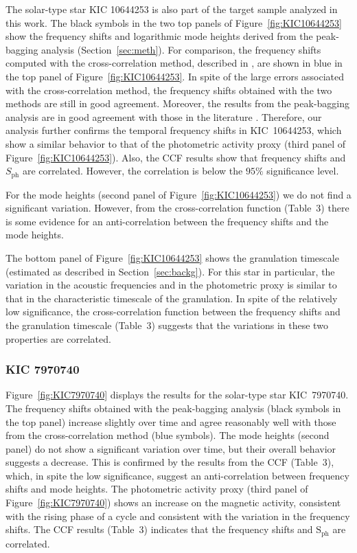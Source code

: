 \documentclass[twocolumn]{aastex61}%
\begin{document}
The solar-type star KIC 10644253 is also part of the target sample analyzed in this work. The black symbols in the two top panels of Figure~\ref{fig:KIC10644253} show the frequency shifts and logarithmic mode heights derived from the peak-bagging analysis (Section~\ref{sec:meth}). For comparison, the frequency shifts computed with the cross-correlation method, described in \citet{Kiefer2017}, are shown in blue in the top panel of Figure~\ref{fig:KIC10644253}. In spite of the large errors associated with the cross-correlation method, the frequency shifts obtained with the two methods are still in good agreement. Moreover, the results from the peak-bagging analysis are in good agreement with those in the literature \citep{Salabert2016,Kiefer2017}. Therefore, our analysis further confirms the temporal frequency shifts in KIC~10644253, which show a similar behavior to that of the photometric activity proxy (third panel of Figure~\ref{fig:KIC10644253}). Also, the CCF results show that frequency shifts and $S_\text{ph}$ are correlated. However, the correlation is below the $95\%$ significance level.

For the mode heights (second panel of Figure~\ref{fig:KIC10644253}) we do not find a significant variation. However, from the cross-correlation function (Table~3) there is some evidence for an anti-correlation between the frequency shifts and the mode heights.%

The bottom panel of Figure~\ref{fig:KIC10644253} shows the granulation timescale (estimated as described in Section~\ref{sec:backg}). For this star in particular, the variation in the acoustic frequencies and in the photometric proxy is similar to that  in the characteristic timescale of the granulation. In spite of the relatively low significance, the cross-correlation function between the frequency shifts and the granulation timescale (Table~3) suggests that the variations in these two properties are correlated.%

\subsubsection{KIC 7970740}

Figure~\ref{fig:KIC7970740} displays the results for the solar-type star KIC~7970740. The frequency shifts obtained with the peak-bagging analysis (black symbols in the top panel) increase slightly over time and agree reasonably well with those from the cross-correlation method (blue symbols). The mode heights (second panel) do not show a significant variation over time, but their overall behavior suggests a decrease. This is confirmed by the results from the CCF (Table~3), which, in spite the low significance, suggest an anti-correlation between frequency shifts and mode heights. The photometric activity proxy (third panel of Figure~\ref{fig:KIC7970740}) shows an increase on the magnetic activity, consistent with the rising phase of a cycle and consistent with the variation in the frequency shifts. The CCF results (Table~3) indicates that the frequency shifts and $\text{S}_\text{ph}$ are correlated.
\end{document}
